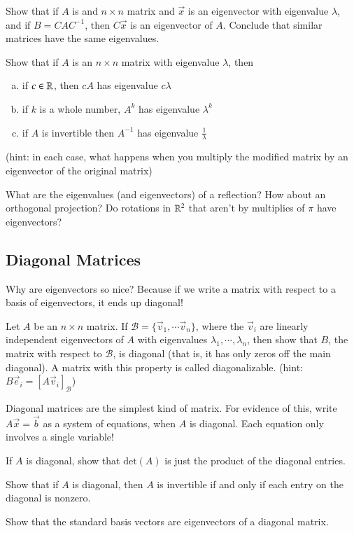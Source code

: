 \documentclass[Main.tex]{subfiles}
\begin{document}
\begin{Ex}
  Show that if $A$ is and $n\times n$ matrix and $\vec{x}$ is an eigenvector with eigenvalue $\lambda$, and if $B=CAC^{-1}$, then $C\vec{x}$ is an eigenvector of $A$.
  Conclude that similar matrices have the same eigenvalues.
\end{Ex}
\begin{Ex}
  Show that if $A$ is an $n\times n$ matrix with eigenvalue $\lambda$, then
  \begin{enumerate}[a)]
    \indentitem \item if $c\in \mathbb{R}$, then $cA$ has eigenvalue $c\lambda$
  \item if $k$ is a whole number, $A^k$ has eigenvalue $\lambda^k$
  \item if $A$ is invertible then $A^{-1}$ has eigenvalue $\frac{1}{\lambda}$
  \end{enumerate}
  (hint: in each case, what happens when you multiply the modified matrix by an eigenvector of the original matrix)
\end{Ex}

\begin{ImpEx}
  What are the eigenvalues (and eigenvectors) of a reflection?
  How about an orthogonal projection?  
  Do rotations in $\mathbb{R}^2$ that aren't by multiplies of $\pi$ have eigenvectors?
\end{ImpEx}


\subsection{Diagonal Matrices}

Why are eigenvectors so nice?
Because if we write a matrix with respect to a basis of eigenvectors, it ends up diagonal!
\begin{ImpEasyEx}
  Let $A$ be an $n\times n$ matrix.  
  If $\mathcal{B}=\{\vec{v}_1,\cdots\vec{v}_n\}$, where the $\vec{v}_i$ are linearly independent eigenvectors of $A$ with eigenvalues $\lambda_1,\cdots,\lambda_n$, then 
  show that $B$, the matrix with respect to $\mathcal{B}$, is diagonal (that is, it has only zeros off the main diagonal).  
  A matrix with this property is called diagonalizable.
  (hint: $B\vec{e}_i= [A\vec{v}_i]_\mathcal{B}$)
\end{ImpEasyEx}
Diagonal matrices are the simplest kind of matrix.
For evidence of this, write $A\vec{x}=\vec{b}$ as a system of equations, when $A$ is diagonal.
Each equation only involves a single variable!
\begin{EasyEx}
  If $A$ is diagonal, show that $\mbox{det}(A)$ is just the product of the diagonal entries.
\end{EasyEx}
\begin{EasyEx}
  Show that if $A$ is diagonal, then $A$ is invertible if and only if each entry on the diagonal is nonzero.
\end{EasyEx}
\begin{EasyEx}
  Show that the standard basis vectors are eigenvectors of a diagonal matrix.
\end{EasyEx}
\end{document}
